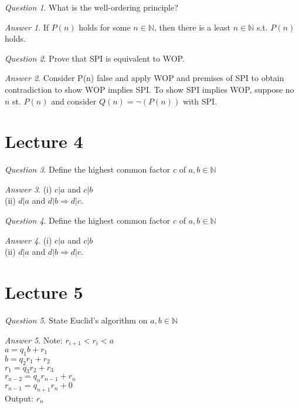 \documentclass[]{article}
\def\naturals{\mathbb{N}}
\theoremstyle{remark}
\theoremstyle{qnstyle}
\newtheorem{question}{Question}
\theoremstyle{answerstyle}
\newtheorem*{answer}{Answer}
\begin{document}
\begin{question}
    What is the well-ordering principle?
\end{question}
\begin{answer}
    If $P(n)$ holds for some $n \in \naturals$, then there is a least $n \in \naturals$ s.t. $P(n)$
 holds. 
\end{answer}

\begin{question}
    Prove that SPI is equivalent to WOP.
\end{question}
\begin{answer}
    Consider P(n) false and apply WOP and premises of SPI to obtain contradiction to show WOP implies SPI.
    To show SPI implies WOP, suppose no $n$ st. $P(n)$ and consider $Q(n) = \neg (P(n))$ with SPI.
\end{answer}





\section* {Lecture 4}

\begin{question}
    Define the highest common factor $c$ of $a, b \in \naturals$
\end{question}
\begin{answer}
    (i) $c|a$ and $c|b$ \\
    (ii) $d|a$ and $d|b \Rightarrow d|c$.
\end{answer}
\begin{question}
    Define the highest common factor $c$ of $a, b \in \naturals$
\end{question}
\begin{answer}
    (i) $c|a$ and $c|b$ \\
    (ii) $d|a$ and $d|b \Rightarrow d|c$.
\end{answer}





\section* {Lecture 5}

\begin{question}
    State Euclid's algorithm on $a,b \in \naturals$
\end{question}
\begin{answer}Note: $r_{i+1} < r_{i} < a$\\
    $a = q_1 b + r_1$\\
    $b = q_2 r_1 + r_2$\\
    $r_1 = q_3 r_2 + r_3$\\
    $r_{n-2} = q_n r_{n-1} + r_n$\\
    $r_{n-1} = q_{n+1} r_n + 0$\\
    Output: $r_n$
\end{answer}
\end{document}
